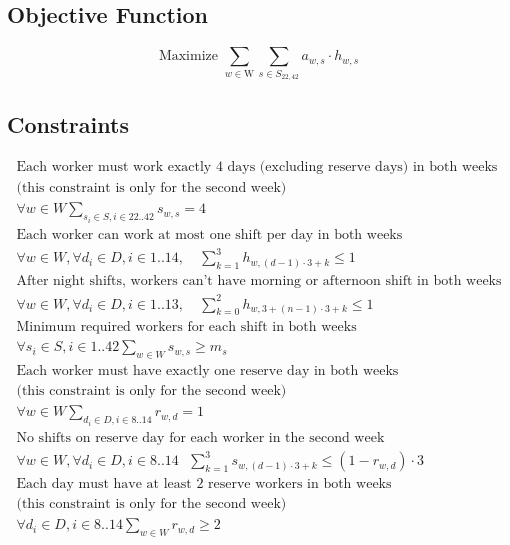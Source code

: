 \documentclass{article}
\begin{document}
\subsection*{Objective Function}
\[
\text{Maximize } \sum_{w \in \text{W}} \sum_{s \in S_{22, 42}} a_{w, s} \cdot h_{w, s}
\]

\subsection*{Constraints}
\begin{gather*}
\text{Each worker must work exactly 4 days (excluding reserve days) in both weeks} \\
\text{(this constraint is only for the second week)} \\
\forall w \in W \sum_{s_i \in S, i \in {22..42}} s_{w, s} = 4 \\
\text{Each worker can work at most one shift per day in both weeks} \\
\forall w \in W, \forall d_i \in D, i \in {1..14}, \quad \sum_{k=1}^{3} h_{w, (d - 1) \cdot 3 + k} \leq 1 \\
\text{After night shifts, workers can't have morning or afternoon shift in both weeks} \\
\forall w \in W, \forall d_i \in D, i \in {1..13}, \quad \sum_{k=0}^{2} h_{w, 3 + (n - 1) \cdot 3 + k} \leq 1 \\
\text{Minimum required workers for each shift in both weeks} \\
\forall s_i \in S, i \in {1..42} \sum_{w \in W} s_{w, s} \geq m_{s} \\
\text{Each worker must have exactly one reserve day in both weeks} \\
\text{(this constraint is only for the second week)} \\
\forall w \in W \sum_{d_i \in D, i \in {8..14}} r_{w, d} = 1 \\
\text{No shifts on reserve day for each worker in the second week} \\
\forall w \in W, \forall d_i \in D, i \in {8..14} \text{ } \sum_{k=1}^{3} s_{w, (d-1) \cdot 3 + k} \leq (1 - r_{w, d}) \cdot 3 \\
\text{Each day must have at least 2 reserve workers in both weeks} \\
\text{(this constraint is only for the second week)} \\
\forall d_i \in D, i \in {8..14} \sum_{w \in W} r_{w, d} \geq 2 \\

\end{gather*}
\end{document}
